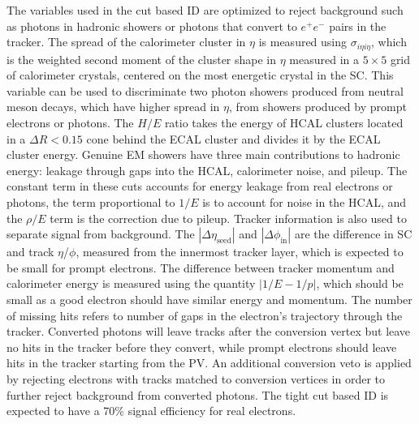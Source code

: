 The variables used in the cut based ID are optimized to reject background such as photons in hadronic showers or photons that convert to $e^+e^-$ pairs in the tracker. The spread of the calorimeter cluster in $\eta$ is measured using $\sigma_{i\eta i\eta}$, which is the weighted second moment of the cluster shape in $\eta$ measured in a $5\times5$ grid of calorimeter crystals, centered on the most energetic crystal in the SC. This variable can be used to discriminate two photon showers produced from neutral meson decays, which have higher spread in $\eta$, from showers produced by prompt electrons or photons. The $H/E$ ratio takes the energy of HCAL clusters located in a $\Delta R<0.15$ cone behind the ECAL cluster and divides it by the ECAL cluster energy. Genuine EM showers have three main contributions to hadronic energy: leakage through gaps into the HCAL, calorimeter noise, and pileup. The constant term in these cuts accounts for energy leakage from real electrons or photons, the term proportional to $1/E$ is to account for noise in the HCAL, and the $\rho/E$ term is the correction due to pileup. Tracker information is also used to separate signal from background. The $|\Delta\eta_\text{seed}|$ and $|\Delta\phi_\text{in}|$ are the difference in SC and track $\eta$/$\phi$, measured from the innermost tracker layer, which is expected to be small for prompt electrons. The difference between tracker momentum and calorimeter energy is measured using the quantity $|1/E-1/p|$, which should be small as a good electron should have similar energy and momentum. The number of missing hits refers to number of gaps in the electron's trajectory through the tracker. Converted photons will leave tracks after the conversion vertex but leave no hits in the tracker before they convert, while prompt electrons should leave hits in the tracker starting from the PV. An additional conversion veto is applied by rejecting electrons with tracks matched to conversion vertices in order to further reject background from converted photons. The tight cut based ID is expected to have a 70\% signal efficiency for real electrons.

